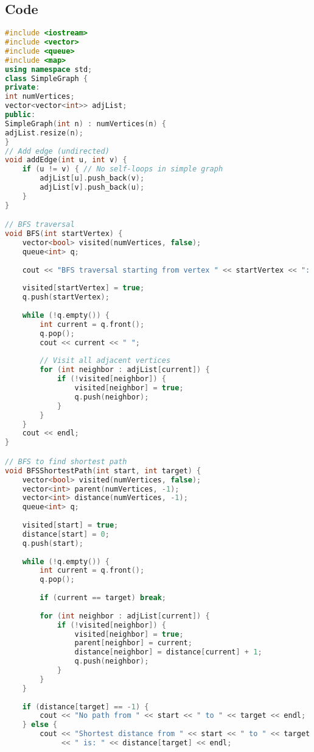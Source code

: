 \documentclass[12pt]{article}
\begin{document}
\subsection{Code}
\begin{lstlisting}[language=C++, caption=BFS cho Simple Graph]
#include <iostream>
#include <vector>
#include <queue>
#include <map>
using namespace std;
class SimpleGraph {
private:
int numVertices;
vector<vector<int>> adjList;
public:
SimpleGraph(int n) : numVertices(n) {
adjList.resize(n);
}
// Add edge (undirected)
void addEdge(int u, int v) {
    if (u != v) { // No self-loops in simple graph
        adjList[u].push_back(v);
        adjList[v].push_back(u);
    }
}

// BFS traversal
void BFS(int startVertex) {
    vector<bool> visited(numVertices, false);
    queue<int> q;
    
    cout << "BFS traversal starting from vertex " << startVertex << ": ";
    
    visited[startVertex] = true;
    q.push(startVertex);
    
    while (!q.empty()) {
        int current = q.front();
        q.pop();
        cout << current << " ";
        
        // Visit all adjacent vertices
        for (int neighbor : adjList[current]) {
            if (!visited[neighbor]) {
                visited[neighbor] = true;
                q.push(neighbor);
            }
        }
    }
    cout << endl;
}

// BFS to find shortest path
void BFSShortestPath(int start, int target) {
    vector<bool> visited(numVertices, false);
    vector<int> parent(numVertices, -1);
    vector<int> distance(numVertices, -1);
    queue<int> q;
    
    visited[start] = true;
    distance[start] = 0;
    q.push(start);
    
    while (!q.empty()) {
        int current = q.front();
        q.pop();
        
        if (current == target) break;
        
        for (int neighbor : adjList[current]) {
            if (!visited[neighbor]) {
                visited[neighbor] = true;
                parent[neighbor] = current;
                distance[neighbor] = distance[current] + 1;
                q.push(neighbor);
            }
        }
    }
    
    if (distance[target] == -1) {
        cout << "No path from " << start << " to " << target << endl;
    } else {
        cout << "Shortest distance from " << start << " to " << target 
             << " is: " << distance[target] << endl;
        

\end{lstlisting}
\end{document}
